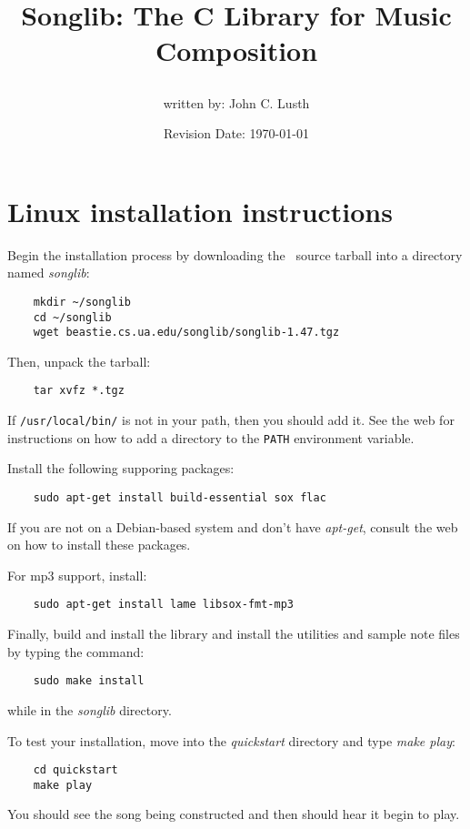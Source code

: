 \documentclass{article}
\title{Songlib: The C Library for Music Composition\\
\date{Revision Date: \today}}
\author{written by: John C. Lusth}
\begin{document}
\maketitle

\W\subsubsection*{}
\W\htmlrule


\section*{Linux installation instructions}

Begin the installation process by downloading the \songlib\ source
tarball into a directory named {\it songlib}:

\begin{verbatim}
    mkdir ~/songlib
    cd ~/songlib
    wget beastie.cs.ua.edu/songlib/songlib-1.47.tgz
\end{verbatim}

Then, unpack the tarball:

\begin{verbatim}
    tar xvfz *.tgz
\end{verbatim}

If \verb!/usr/local/bin/! is not in your path, then you
should add it. See the web for instructions on how to add
a directory to the \verb!PATH! environment variable.

Install the following supporing packages:

\begin{verbatim}
    sudo apt-get install build-essential sox flac
\end{verbatim}

If you are not on a Debian-based system and don't have {\it apt-get}, 
consult the web on how to install these packages.

For mp3 support, install:

\begin{verbatim}
    sudo apt-get install lame libsox-fmt-mp3 
\end{verbatim}
    
Finally, build and install the library and install the utilities
and sample note files by typing the command:

\begin{verbatim}
    sudo make install
\end{verbatim}

while in the {\it songlib} directory.

To test your installation, move into the {\it quickstart} directory and
type {\it make play}:

\begin{verbatim}
    cd quickstart
    make play
\end{verbatim}

You should see the song being constructed and then should hear it
begin to play.
\end{document}
